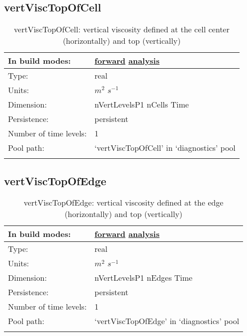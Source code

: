 \subsection[vertViscTopOfCell]{vertViscTopOfCell}
\label{subsec:var_sec_diagnostics_vertViscTopOfCell}
\begin{center}
\begin{longtable}{| p{2.0in} | p{4.0in} |}
        \hline 
        In build modes: & \hyperref[subsec:forward_var_tab_diagnostics]{forward} \hyperref[subsec:analysis_var_tab_diagnostics]{analysis} \\
        \hline 
        Type: & real \\
        \hline 
        Units: & $m^2$ $s^{-1}$ \\
        \hline 
        Dimension: & nVertLevelsP1 nCells Time \\
        \hline 
        Persistence: & persistent \\
        \hline 
        Number of time levels: & 1 \\
        \hline 
            Pool path: & `vertViscTopOfCell' in `diagnostics' pool \\
		 \hline 
    \caption{vertViscTopOfCell: vertical viscosity defined at the cell center (horizontally) and top (vertically)}
\end{longtable}
\end{center}
\subsection[vertViscTopOfEdge]{vertViscTopOfEdge}
\label{subsec:var_sec_diagnostics_vertViscTopOfEdge}
\begin{center}
\begin{longtable}{| p{2.0in} | p{4.0in} |}
        \hline 
        In build modes: & \hyperref[subsec:forward_var_tab_diagnostics]{forward} \hyperref[subsec:analysis_var_tab_diagnostics]{analysis} \\
        \hline 
        Type: & real \\
        \hline 
        Units: & $m^2$ $s^{-1}$ \\
        \hline 
        Dimension: & nVertLevelsP1 nEdges Time \\
        \hline 
        Persistence: & persistent \\
        \hline 
        Number of time levels: & 1 \\
        \hline 
            Pool path: & `vertViscTopOfEdge' in `diagnostics' pool \\
		 \hline 
    \caption{vertViscTopOfEdge: vertical viscosity defined at the edge (horizontally) and top (vertically)}
\end{longtable}
\end{center}
